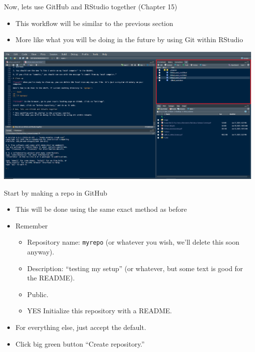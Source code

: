\documentclass[
  ignorenonframetext,
]{beamer}
\providecommand{\tightlist}{%
  \setlength{\itemsep}{0pt}\setlength{\parskip}{0pt}}
\begin{document}
\begin{frame}{Now, lets use GitHub and RStudio together (Chapter 15)}
\protect\hypertarget{now-lets-use-github-and-rstudio-together-chapter-15}{}

\begin{itemize}
\tightlist
\item
  This workflow will be similar to the previous section
\item
  More like what you will be doing in the future by using Git within
  RStudio
\end{itemize}

\includegraphics{pres_figs/git_in_rstuido.png}

\end{frame}

\begin{frame}[fragile]{Start by making a repo in GitHub}
\protect\hypertarget{start-by-making-a-repo-in-github}{}

\begin{itemize}
\tightlist
\item
  This will be done using the same exact method as before
\item
  Remember

  \begin{itemize}
  \tightlist
  \item
    Repository name: \texttt{myrepo} (or whatever you wish, we'll delete
    this soon anyway).
  \item
    Description: ``testing my setup'' (or whatever, but some text is
    good for the README).
  \item
    Public.
  \item
    YES Initialize this repository with a README.
  \end{itemize}
\item
  For everything else, just accept the default.
\item
  Click big green button ``Create repository.''
\end{itemize}

\end{frame}
\end{document}
